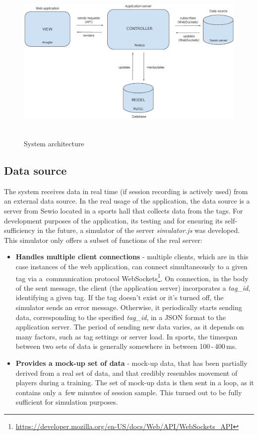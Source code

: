 \begin{figure}[htb]
\begin{center}
  \includegraphics*[width=14cm,height=8cm,keepaspectratio]{images/application_structure}
\end{center}
\caption{System architecture}
\label{img:sysarch}
\end{figure}

\subsection{Data source}
The system receives data in real time (if session recording is actively used) from an external data source. In the real usage of the application, the data source is a server from Sewio located in a sports hall that collects data from the tags. For development purposes of the application, its testing and for ensuring its self-sufficiency in the future, a simulator of the server \textit{simulator.js} was developed. This simulator only offers a subset of functions of the real server:

\begin{itemize}
\item \textbf{Handles multiple client connections} - multiple clients, which are in this case instances of the web application, can connect simultaneously to a given tag via a~communication protocol WebSockets\footnote{\url{https://developer.mozilla.org/en-US/docs/Web/API/WebSockets_API}}. On connection, in the body of the sent message, the client (the application server) incorporates a \textit{tag\_id}, identifying a given tag. If the tag doesn’t exist or it’s turned off, the simulator sends an error message. Otherwise, it periodically starts sending data, corresponding to the specified \textit{tag\_id}, in a JSON format to the application server. The period of sending new data varies, as it depends on many factors, such as tag settings or server load. In sports, the timespan between two sets of data is generally somewhere in between 100\,-\,400\,ms.
\item \textbf{Provides a mock-up set of data} - mock-up data, that has been partially derived from a real set of data, and that credibly resembles movement of players during a training. The set of mock-up data is then sent in a loop, as it contains only a~few minutes of session sample. This turned out to be fully sufficient for simulation purposes.
\end{itemize}

